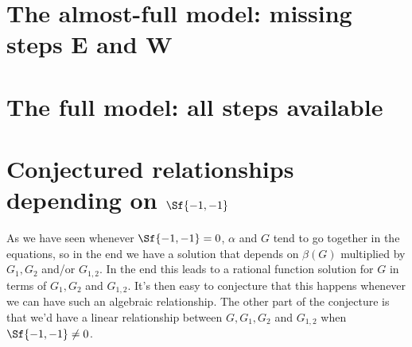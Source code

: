 \section{The almost-full model: missing steps E and W}

\section{The full model: all steps available}

\section{Conjectured relationships depending on $\Sf{-1,-1}$}
As we have seen whenever $\Sf{-1,-1} = 0$, $\alpha$ and $G$ tend to go together in the equations, so in the end we have a solution that depends on $\beta(G)$ multiplied by $G_1,G_2$ and/or $G_{1,2}$. In the end this leads to a rational function solution for $G$ in terms of $G_1, G_2$ and $G_{1,2}$. It's then easy to conjecture that this happens whenever we can have such an algebraic relationship. The other part of the conjecture is that we'd have a linear relationship between $G, G_1,G_2$ and $G_{1,2}$ when $\Sf{-1,-1} \neq 0$.

\endinput
